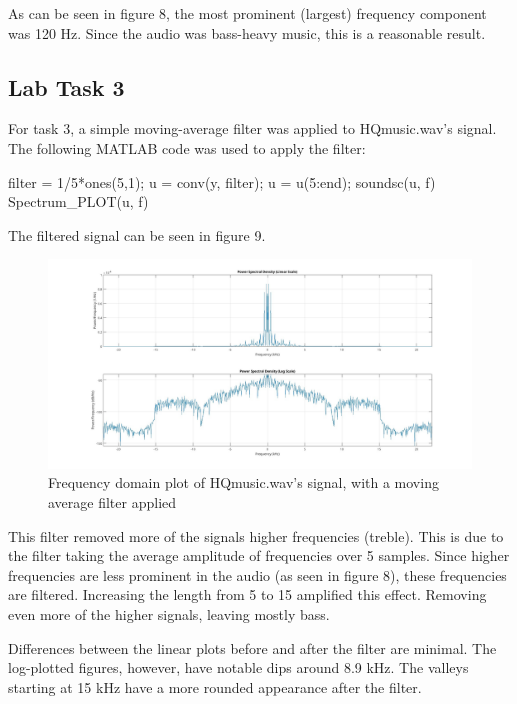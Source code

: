 \documentclass[a4paper,11pt]{article}
\begin{document}
As can be seen in figure 8, the most prominent (largest) frequency component was 120 Hz. Since the audio was bass-heavy music, this is a reasonable result.

\subsection{Lab Task 3}
For task 3, a simple moving-average filter was applied to HQmusic.wav's signal. The following MATLAB code was used to apply the filter:

\begin{ffcode}
filter = 1/5*ones(5,1);
u = conv(y, filter);
u = u(5:end);
soundsc(u, f)
Spectrum_PLOT(u, f)
\end{ffcode}

The filtered signal can be seen in figure 9.
\begin{figure}[H]
    \centering
    \hspace{-60pt}\includegraphics[scale = 0.28]{./images/Task3-filtered.jpg}
    \caption{Frequency domain plot of HQmusic.wav's signal, with a moving average filter applied}
    \label{fig:my_label}
\end{figure}
This filter removed more of the signals higher frequencies (treble). This is due to the filter taking the average amplitude of frequencies over 5 samples. Since higher frequencies are less prominent in the audio (as seen in figure 8), these frequencies are filtered. Increasing the length from 5 to 15 amplified this effect. Removing even more of the higher signals, leaving mostly bass.

Differences between the linear plots before and after the filter are minimal. The log-plotted figures, however, have notable dips around 8.9 kHz. The valleys starting at 15 kHz have a more rounded appearance after the filter.
\end{document}

